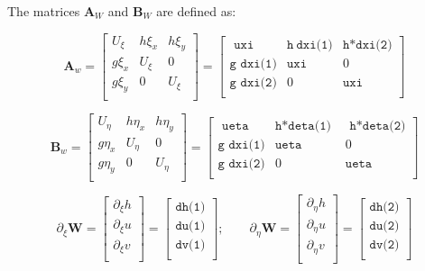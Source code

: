 \documentclass{article}
\newcommand{\code}[1]{\texttt{#1}}
\begin{document}
The matrices $\mathbf{A}_W$ and $\mathbf{B}_W$ are defined as: 

\[ \mathbf{A}_w = 
\begin{bmatrix}
    U_{\xi} & h \xi_x & h \xi_{y} \\
    g \xi_x &    U_{\xi}  & 0    \\
    g \xi_y &   0   & U_{\xi}    \\    
\end{bmatrix} =
\begin{bmatrix}
    \code{ uxi }& \code{h} \ \code{dxi(1)} &\code{h*dxi(2)}\\
    \code{g dxi(1)}& \code{uxi} & 0  \\    
    \code{g dxi(2)}&     0       & \code{uxi}  \\          
\end{bmatrix} 
\]

\[ \mathbf{B}_w = 
\begin{bmatrix}
    U_{\eta} & h \eta_x    & h \eta_{y} \\
    g \eta_x &    U_{\eta}  & 0    \\
    g \eta_y &      0       & U_{\eta}    \\    
\end{bmatrix} =
\begin{bmatrix}
    \code{ ueta }  & \code{h*deta(1) } & \code{ h*deta(2)}\\
    \code{g dxi(1)} & \code{ueta}  & 0  \\    
    \code{g dxi(2)} &     0  	   &  \code{ueta}  \\          
\end{bmatrix} 
\]


\[ \partial_\xi \mathbf{W} = 
\begin{bmatrix}
    \partial_\xi h \\
	\partial_\xi u \\
    \partial_\xi v \\
\end{bmatrix}
 =  {
	 \begin{bmatrix}
	 \code{dh(1)} \\
	 \code{du(1)} \\	 
	 \code{dv(1)} \\	 	 	 
\end{bmatrix} 
}  ;  \quad  \quad
\partial_\eta \mathbf{W} = 
\begin{bmatrix}
    \partial_\eta h \\
	\partial_\eta u \\
    \partial_\eta v \\
\end{bmatrix}
 =  {
	 \begin{bmatrix}
	 \code{dh(2)} \\
	 \code{du(2)} \\	 
	 \code{dv(2)} \\	 	 	 
\end{bmatrix} 
}
 \] 
\end{document}
